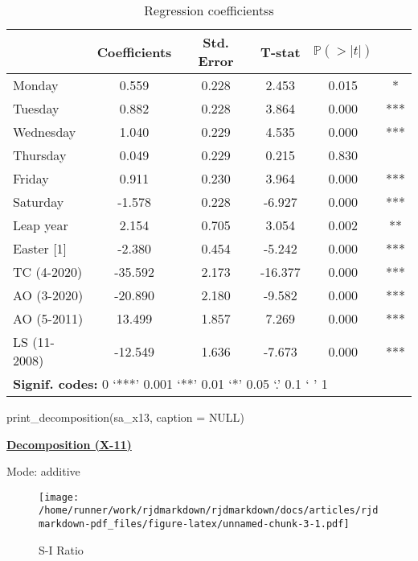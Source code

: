 \documentclass[
]{article}
\newenvironment{Shaded}{\begin{snugshade}}{\end{snugshade}}
\newcommand{\AttributeTok}[1]{\textcolor[rgb]{0.77,0.63,0.00}{#1}}
\newcommand{\ConstantTok}[1]{\textcolor[rgb]{0.00,0.00,0.00}{#1}}
\newcommand{\FunctionTok}[1]{\textcolor[rgb]{0.00,0.00,0.00}{#1}}
\newcommand{\NormalTok}[1]{#1}
\begin{document}
\begin{table}[H]
\centering
\caption{\label{tab:unnamed-chunk-3}Regression coefficientss}
\centering
\begin{tabular}[t]{lccccc}
\toprule
  & Coefficients & Std. Error & T-stat & $\mathbb P (> \lvert t \rvert)$ & \\
\midrule
Monday & 0.559 & 0.228 & 2.453 & 0.015 & *\\
Tuesday & 0.882 & 0.228 & 3.864 & 0.000 & ***\\
Wednesday & 1.040 & 0.229 & 4.535 & 0.000 & ***\\
Thursday & 0.049 & 0.229 & 0.215 & 0.830 & \\
Friday & 0.911 & 0.230 & 3.964 & 0.000 & ***\\
\addlinespace
Saturday & -1.578 & 0.228 & -6.927 & 0.000 & ***\\
Leap year & 2.154 & 0.705 & 3.054 & 0.002 & **\\
Easter [1] & -2.380 & 0.454 & -5.242 & 0.000 & ***\\
TC (4-2020) & -35.592 & 2.173 & -16.377 & 0.000 & ***\\
AO (3-2020) & -20.890 & 2.180 & -9.582 & 0.000 & ***\\
\addlinespace
AO (5-2011) & 13.499 & 1.857 & 7.269 & 0.000 & ***\\
LS (11-2008) & -12.549 & 1.636 & -7.673 & 0.000 & ***\\
\bottomrule
\multicolumn{6}{l}{\rule{0pt}{1em}\textbf{Signif. codes: }0 `***' 0.001 `**' 0.01 `*' 0.05 `.' 0.1 ` ' 1}\\
\end{tabular}
\end{table}

\begin{Shaded}
\begin{Highlighting}[]
\FunctionTok{print\_decomposition}\NormalTok{(sa\_x13, }\AttributeTok{caption =} \ConstantTok{NULL}\NormalTok{)}
\end{Highlighting}
\end{Shaded}

\underline{\textbf{Decomposition (X-11)}}

Mode: additive

\begin{figure}
\centering
\texttt{[image: /home/runner/work/rjdmarkdown/rjdmarkdown/docs/articles/rjdmarkdown-pdf\_files/figure-latex/unnamed-chunk-3-1.pdf]}
\caption{S-I Ratio}
\end{figure}
\end{document}
